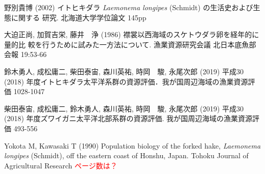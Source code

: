 \documentclass[11pt]{article} %
\begin{document}
\begin{linenumbers}
\noindent
野別貴博 (2002) イトヒキダラ \textit{Laemonema longipes} (Schmidt) の生活史および生態に関する
研究. 北海道大学学位論文 145pp

\noindent
大迫正尚, 加賀吉栄, 藤井　浄 (1986) 襟裳以西海域のスケトウダラ卵を経年的に量的比
較を行うために試みた一方法について. 漁業資源研究会議 北日本底魚部会報 19:53-66

\noindent
鈴木勇人, 成松庸二, 柴田泰宙, 森川英祐, 時岡　駿, 永尾次郎 (2019) 平成30 (2018) 年度イトヒキダラ太平洋系群の資源評価．我が国周辺海域の漁業資源評価 1028-1047

\noindent
柴田泰宙, 成松庸二, 鈴木勇人, 森川英祐, 時岡　駿, 永尾次郎 (2019) 平成30 (2018) 
年度ズワイガニ太平洋北部系群の資源評価. 我が国周辺海域の漁業資源評価 493-556

\noindent
Yokota M, Kawasaki T (1990) Population biology of the forked hake, \textit{Laemonema longipes} 
 (Schmidt), off the eastern coast of Honshu, Japan. Tohoku Journal of Agricultural Research 
\textcolor{red}{ページ数は？}



\end{linenumbers}
\end{document}
